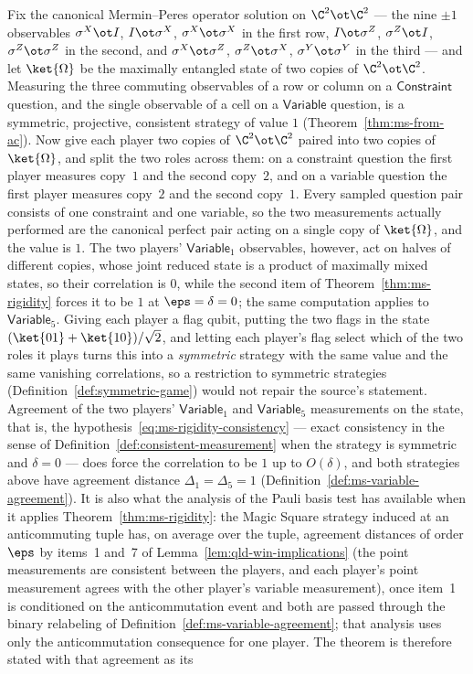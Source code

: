 \begin{remark}\label{rem:ms-rigidity-strategy-class}
	Fix the canonical Mermin--Peres operator solution on $\C^2 \ot \C^2$ --- the nine $\pm 1$ observables $\sigma^X \ot I$, $I \ot \sigma^X$, $\sigma^X \ot \sigma^X$ in the first row, $I \ot \sigma^Z$, $\sigma^Z \ot I$, $\sigma^Z \ot \sigma^Z$ in the second, and $\sigma^X \ot \sigma^Z$, $\sigma^Z \ot \sigma^X$, $\sigma^Y \ot \sigma^Y$ in the third --- and let $\ket{\Omega}$ be the maximally entangled state of two copies of $\C^2 \ot \C^2$. Measuring the three commuting observables of a row or column on a $\mathsf{Constraint}$ question, and the single observable of a cell on a $\mathsf{Variable}$ question, is a symmetric, projective, consistent strategy of value $1$ (Theorem~\ref{thm:ms-from-ac}). Now give each player two copies of $\C^2 \ot \C^2$ paired into two copies of $\ket{\Omega}$, and split the two roles across them: on a constraint question the first player measures copy~$1$ and the second copy~$2$, and on a variable question the first player measures copy~$2$ and the second copy~$1$. Every sampled question pair consists of one constraint and one variable, so the two measurements actually performed are the canonical perfect pair acting on a single copy of $\ket{\Omega}$, and the value is $1$. The two players' $\mathsf{Variable}_1$ observables, however, act on halves of different copies, whose joint reduced state is a product of maximally mixed states, so their correlation is $0$, while the second item of Theorem~\ref{thm:ms-rigidity} forces it to be $1$ at $\eps = \delta = 0$; the same computation applies to $\mathsf{Variable}_5$. Giving each player a flag qubit, putting the two flags in the state $(\ket{01}+\ket{10})/\sqrt2$, and letting each player's flag select which of the two roles it plays turns this into a \emph{symmetric} strategy with the same value and the same vanishing correlations, so a restriction to symmetric strategies (Definition~\ref{def:symmetric-game}) would not repair the source's statement. Agreement of the two players' $\mathsf{Variable}_1$ and $\mathsf{Variable}_5$ measurements on the state, that is, the hypothesis~\eqref{eq:ms-rigidity-consistency} --- exact consistency in the sense of Definition~\ref{def:consistent-measurement} when the strategy is symmetric and $\delta = 0$ --- does force the correlation to be $1$ up to $O(\delta)$, and both strategies above have agreement distance $\Delta_1 = \Delta_5 = 1$ (Definition~\ref{def:ms-variable-agreement}). It is also what the analysis of the Pauli basis test has available when it applies Theorem~\ref{thm:ms-rigidity}: the Magic Square strategy induced at an anticommuting tuple has, on average over the tuple, agreement distances of order $\eps$ by items~1 and~7 of Lemma~\ref{lem:qld-win-implications} (the point measurements are consistent between the players, and each player's point measurement agrees with the other player's variable measurement), once item~1 is conditioned on the anticommutation event and both are passed through the binary relabeling of Definition~\ref{def:ms-variable-agreement}; that analysis uses only the anticommutation consequence for one player. The theorem is therefore stated with that agreement as its 
\end{remark}
